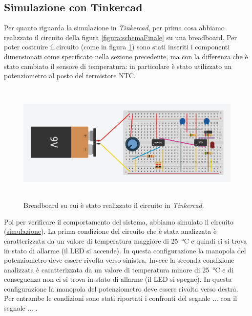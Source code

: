 \documentclass{report}
\begin{document}
\subsection{Simulazione con Tinkercad}\label{tinkercad}
Per quanto riguarda la simulazione in \textit{Tinkercad}, per prima cosa abbiamo realizzato il circuito della figura \ref{figura:schemaFinale} su una breadboard. Per poter costruire il circuito (come in figura \ref{figura:tinkercad_breadboard}) sono stati inseriti i componenti dimensionati come specificato nella sezione precedente, ma con la differenza che è stato cambiato il sensore di temperatura: in particolare è stato utilizzato un potenziometro al posto del termistore NTC.
\begin{figure}[h!]
	\centering
	\includegraphics[height=6cm]{immagini/tinkercad_breadboard}
	\caption{Breadboard su cui è stato realizzato il circuito in \textit{Tinkercad}.} 
	\label{figura:tinkercad_breadboard}
\end{figure}
\newpage
Poi per verificare il comportamento del sistema, abbiamo simulato il circuito (\textcolor{blue}{\underline{\href{https://www.tinkercad.com/things/5cgEecbtMyg-copy-of-stunning-snicket/editel?sharecode=9z73QqFvXyHOBVZMRfgNmmMNsfyYwwq-TDywLOMkaKc}{simulazione}}}). La prima condizione del circuito che è stata analizzata è caratterizzata da un valore di temperatura maggiore di \SI{25}{\celsius} e quindi ci si trova in stato di allarme (il LED si accende). In questa configurazione la manopola del potenziometro deve essere rivolta verso sinistra. Invece la seconda condizione analizzata è caratterizzata da un valore di temperatura minore di \SI{25}{\celsius} e di conseguenza non ci si trova in stato di allarme (il LED si spegne). In questa configurazione la manopola del potenziometro deve essere rivolta verso destra.
\\Per entrambe le condizioni sono stati riportati i confronti del segnale ... con il segnale ... .
\end{document}

